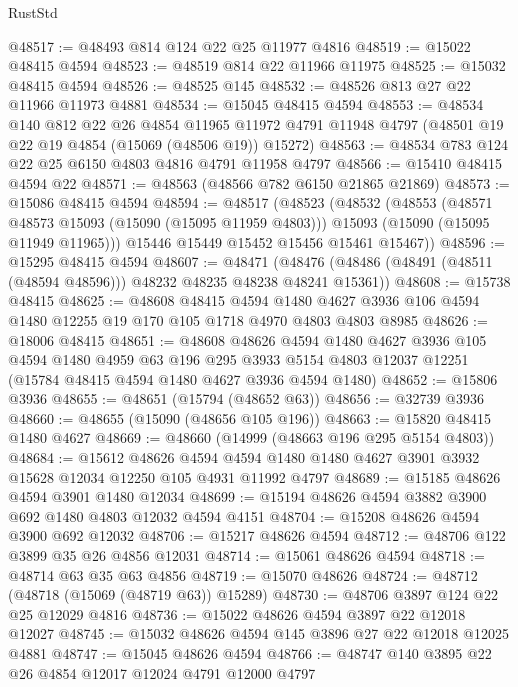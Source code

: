 \begin{lexlean}{RustStd}
\begin{coremodule}
@48517 := @48493 @814 @124 @22 @25 @11977 @4816
@48519 := @15022 @48415 @4594
@48523 := @48519 @814 @22 @11966 @11975
@48525 := @15032 @48415 @4594
@48526 := @48525 @145
@48532 := @48526 @813 @27 @22 @11966 @11973 @4881
@48534 := @15045 @48415 @4594
@48553 := @48534
    @140
    @812
    @22
    @26
    @4854
    @11965
    @11972
    @4791
    @11948
    @4797
    (@48501 @19 @22 @19 @4854 (@15069 (@48506 @19)) @15272)
@48563 := @48534 @783 @124 @22 @25 @6150 @4803 @4816 @4791 @11958 @4797
@48566 := @15410 @48415 @4594 @22
@48571 := @48563 (@48566 @782 @6150 @21865 @21869)
@48573 := @15086 @48415 @4594
@48594 := @48517
    (@48523
      (@48532
        (@48553
          (@48571 @48573 @15093 (@15090 (@15095 @11959 @4803)))
          @15093
          (@15090 (@15095 @11949 @11965)))
        @15446
        @15449
        @15452
        @15456
        @15461
        @15467))
@48596 := @15295 @48415 @4594
@48607 := @48471
    (@48476 (@48486 (@48491 (@48511 (@48594 @48596))) @48232 @48235 @48238 @48241 @15361))
@48608 := @15738 @48415
@48625 := @48608
    @48415
    @4594
    @1480
    @4627
    @3936
    @106
    @4594
    @1480
    @12255
    @19
    @170
    @105
    @1718
    @4970
    @4803
    @4803
    @8985
@48626 := @18006 @48415
@48651 := @48608
    @48626
    @4594
    @1480
    @4627
    @3936
    @105
    @4594
    @1480
    @4959
    @63
    @196
    @295
    @3933
    @5154
    @4803
    @12037
    @12251
    (@15784 @48415 @4594 @1480 @4627 @3936 @4594 @1480)
@48652 := @15806 @3936
@48655 := @48651 (@15794 (@48652 @63))
@48656 := @32739 @3936
@48660 := @48655 (@15090 (@48656 @105 @196))
@48663 := @15820 @48415 @1480 @4627
@48669 := @48660 (@14999 (@48663 @196 @295 @5154 @4803))
@48684 := @15612
    @48626
    @4594
    @4594
    @1480
    @1480
    @4627
    @3901
    @3932
    @15628
    @12034
    @12250
    @105
    @4931
    @11992
    @4797
@48689 := @15185 @48626 @4594 @3901 @1480 @12034
@48699 := @15194 @48626 @4594 @3882 @3900 @692 @1480 @4803 @12032 @4594 @4151
@48704 := @15208 @48626 @4594 @3900 @692 @12032
@48706 := @15217 @48626 @4594
@48712 := @48706 @122 @3899 @35 @26 @4856 @12031
@48714 := @15061 @48626 @4594
@48718 := @48714 @63 @35 @63 @4856
@48719 := @15070 @48626
@48724 := @48712 (@48718 (@15069 (@48719 @63)) @15289)
@48730 := @48706 @3897 @124 @22 @25 @12029 @4816
@48736 := @15022 @48626 @4594 @3897 @22 @12018 @12027
@48745 := @15032 @48626 @4594 @145 @3896 @27 @22 @12018 @12025 @4881
@48747 := @15045 @48626 @4594
@48766 := @48747
    @140
    @3895
    @22
    @26
    @4854
    @12017
    @12024
    @4791
    @12000
    @4797

\end{coremodule}
\end{lexlean}
